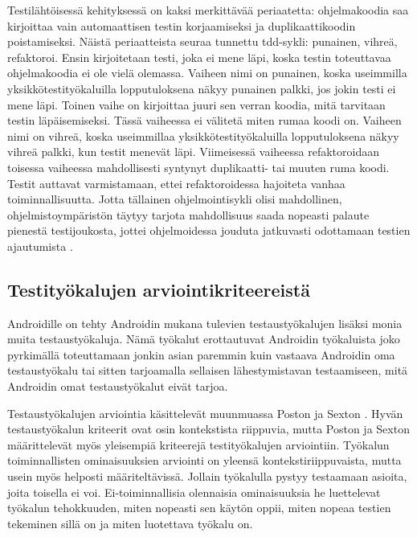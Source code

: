 Testilähtöisessä kehityksessä on kaksi merkittävää periaatetta: ohjelmakoodia saa kirjoittaa vain automaattisen testin korjaamiseksi ja duplikaattikoodin poistamiseksi. Näistä periaatteista seuraa tunnettu tdd-sykli: punainen, vihreä, refaktoroi. Ensin kirjoitetaan testi, joka ei mene läpi, koska testin toteuttavaa ohjelmakoodia ei ole vielä olemassa. Vaiheen nimi on punainen, koska useimmilla yksikkötestityökaluilla lopputuloksena näkyy punainen palkki, jos jokin testi ei mene läpi. Toinen vaihe on kirjoittaa juuri sen verran koodia, mitä tarvitaan testin läpäisemiseksi. Tässä vaiheessa ei välitetä miten rumaa koodi on. Vaiheen nimi on vihreä, koska useimmillaa yksikkötestityökaluilla lopputuloksena näkyy vihreä palkki, kun testit menevät läpi. Viimeisessä vaiheessa refaktoroidaan toisessa vaiheessa mahdollisesti syntynyt duplikaatti- tai muuten ruma koodi. Testit auttavat varmistamaan, ettei refaktoroidessa hajoiteta vanhaa toiminnallisuutta. Jotta tällainen ohjelmointisykli olisi mahdollinen, ohjelmistoympäristön täytyy tarjota mahdollisuus saada nopeasti palaute pienestä testijoukosta, jottei ohjelmoidessa jouduta jatkuvasti odottamaan testien ajautumista \cite{tdd}.

\subsection{Testityökalujen arviointikriteereistä}

Androidille on tehty Androidin mukana tulevien testaustyökalujen lisäksi monia muita testaustyökaluja. Nämä työkalut erottautuvat Androidin työkaluista joko pyrkimällä toteuttamaan jonkin asian paremmin kuin vastaava Androidin oma testaustyökalu tai sitten tarjoamalla sellaisen lähestymistavan testaamiseen, mitä Androidin omat testaustyökalut eivät tarjoa.

Testaustyökalujen arviointia käsittelevät muunmuassa Poston ja Sexton \cite{poston92}. Hyvän testaustyökalun kriteerit ovat osin kontekstista riippuvia, mutta Poston ja Sexton määrittelevät myös yleisempiä kriteerejä testityökalujen arviointiin. Työkalun toiminnallisten ominaisuuksien arviointi on yleensä kontekstiriippuvaista, mutta usein myös helposti määriteltävissä. Jollain työkalulla pystyy testaamaan asioita, joita toisella ei voi. Ei-toiminnallisia olennaisia ominaisuuksia he luettelevat työkalun tehokkuuden, miten nopeasti sen käytön oppii, miten nopeaa testien tekeminen sillä on ja miten luotettava työkalu on.

